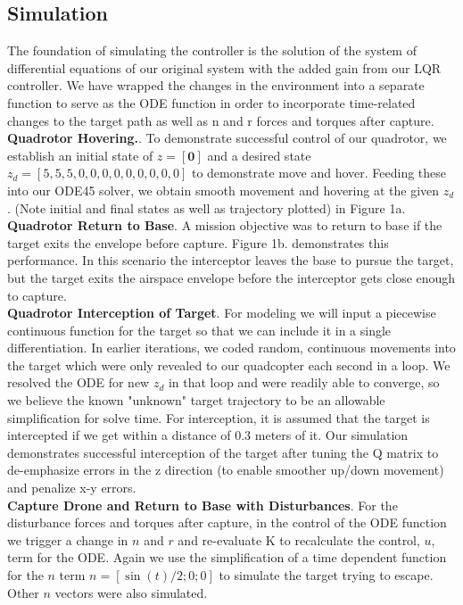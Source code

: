 \documentclass{article}
\begin{document}
\begin{multicols}{2}
\section*{Simulation}
\noindent
The foundation of simulating the controller is the solution of the system of differential equations of our original system with the added 
gain from our LQR controller.  We have wrapped the changes in the environment into a separate function to serve as the ODE 
function in order to incorporate time-related changes to the target path as well as n and r forces and torques after capture.\\
\textbf{Quadrotor Hovering.}. To demonstrate successful control of our quadrotor, we establish an initial state of $z=[\mathbf{0}]$ and 
a desired state $z_d=[5,5,5,0,0,0,0,0,0,0,0,0] $ to demonstrate move and hover.  Feeding these into our ODE45 solver, we obtain 
smooth movement and hovering at the given $z_d$.  (Note initial and final states as well as trajectory plotted) in Figure 1a.\\
\textbf{Quadrotor Return to Base}. A mission objective was to return to base if the target exits the envelope before capture.  
Figure 1b. demonstrates this performance. In this scenario the interceptor leaves the base to pursue the target, but the target exits 
the airspace envelope before the interceptor gets close enough to capture.\\
\textbf{Quadrotor Interception of Target}. For modeling we will input a piecewise continuous function for the target so that we can 
include it in a single differentiation.  In earlier iterations, we coded random, continuous movements into the target which were only 
revealed to our quadcopter each second in a loop.  We resolved the ODE for new $z_d$ in that loop and were readily able to converge, so we believe the known "unknown" target trajectory to be an allowable simplification for solve time.
For interception, it is assumed that the target is intercepted if we get within a distance of 0.3 meters of it.   Our simulation demonstrates 
successful interception of the target after tuning the Q matrix to de-emphasize errors in the z direction (to enable smoother up/down 
movement) and penalize x-y errors.  \\
\textbf{Capture Drone and Return to Base  with Disturbances}.  For the disturbance forces and torques after capture,  in the control of the ODE function we trigger a change in $n$ and $r$ and re-evaluate K  to recalculate the control, $u$, term for the ODE.  Again we use the simplification of a time dependent function for the $n$ term $n=[\sin(t)/2; 0; 0]$ to simulate the target trying to escape.  Other $n$ vectors were also simulated.\\

\end{multicols}
\end{document}
